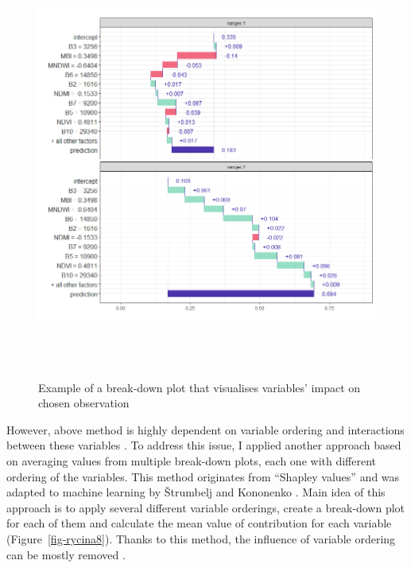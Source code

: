 \documentclass{amuthesis}
\begin{document}
\begin{figure}[H]

{\centering \includegraphics[width=5.20833in,height=5.57292in]{./figures/break-down_plot.png}

}

\caption{\label{fig-rycina7}Example of a break-down plot that visualises
variables' impact on chosen observation}

\end{figure}

However, above method is highly dependent on variable ordering and
interactions between these variables \autocite{biecek_explanatory_2021}.
To address this issue, I applied another approach based on averaging
values from multiple break-down plots, each one with different ordering
of the variables. This method originates from ``Shapley values''
\autocite{shapley_value_1953} and was adapted to machine learning by
Štrumbelj and Kononenko \autocite*{strumbelj_efficient_2010}. Main idea
of this approach is to apply several different variable orderings,
create a break-down plot for each of them and calculate the mean value
of contribution for each variable (Figure~\ref{fig-rycina8}). Thanks to
this method, the influence of variable ordering can be mostly removed
\autocite{biecek_explanatory_2021}.
\end{document}
